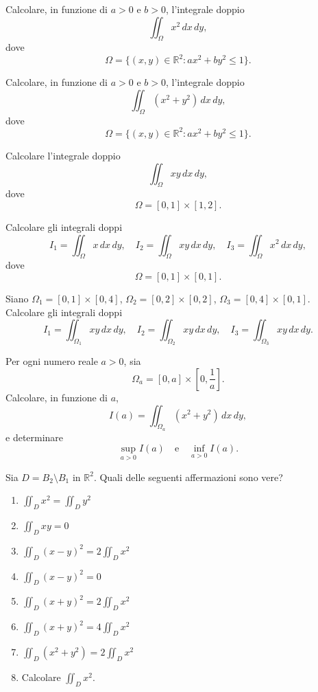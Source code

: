 \begin{exercise}
	Calcolare, in funzione di \( a > 0 \) e \( b > 0 \), l'integrale doppio
	\[
	\iint_\Omega x^2 \, dx \, dy,
	\]
	dove
	\[
	\Omega = \{(x, y) \in \mathbb{R}^2 : ax^2 + by^2 \leq 1\}.
	\]
\end{exercise}
\begin{exercise}
	Calcolare, in funzione di \( a > 0 \) e \( b > 0 \), l'integrale doppio
	\[
	\iint_\Omega (x^2 + y^2) \, dx \, dy,
	\]
	dove
	\[
	\Omega = \{(x, y) \in \mathbb{R}^2 : ax^2 + by^2 \leq 1\}.
	\]
\end{exercise}
\begin{exercise}
	Calcolare l'integrale doppio
	\[
	\iint_\Omega xy \, dx \, dy,
	\]
	dove
	\[
	\Omega = [0, 1] \times [1, 2].
	\]
\end{exercise}
\begin{exercise}
	Calcolare gli integrali doppi
	\[
	I_1 = \iint_\Omega x \, dx \, dy, \quad I_2 = \iint_\Omega xy \, dx \, dy, \quad I_3 = \iint_\Omega x^2 \, dx \, dy,
	\]
	dove
	\[
	\Omega = [0, 1] \times [0, 1].
	\]
\end{exercise}
\begin{exercise}
	Siano \( \Omega_1 = [0, 1] \times [0, 4] \), \( \Omega_2 = [0, 2] \times [0, 2] \), \( \Omega_3 = [0, 4] \times [0, 1] \). Calcolare gli integrali doppi
	\[
	I_1 = \iint_{\Omega_1} xy \, dx \, dy, \quad I_2 = \iint_{\Omega_2} xy \, dx \, dy, \quad I_3 = \iint_{\Omega_3} xy \, dx \, dy.
	\]\end{exercise}

\begin{exercise}
	Per ogni numero reale \( a > 0 \), sia
	\[
	\Omega_a = [0, a] \times \left[0, \frac{1}{a}\right].
	\]
	Calcolare, in funzione di \( a \),
	\[
	I(a) = \iint_{\Omega_a} (x^2 + y^2) \, dx \, dy,
	\]
	e determinare
	\[
	\sup_{a > 0} I(a) \quad \text{e} \quad \inf_{a > 0} I(a).
	\]
\end{exercise}
\begin{exercise}
	Sia \( D = B_2 \setminus B_1 \) in \( \mathbb{R}^2 \). Quali delle seguenti affermazioni sono vere?
	\begin{enumerate}
		\item \( \iint_D x^2 = \iint_D y^2 \)
		\item \( \iint_D xy = 0 \)
		\item \( \iint_D (x - y)^2 = 2 \iint_D x^2 \)
		\item \( \iint_D (x - y)^2 = 0 \)
		\item \( \iint_D (x + y)^2 = 2 \iint_D x^2 \)
		\item \( \iint_D (x + y)^2 = 4 \iint_D x^2 \)
		\item \( \iint_D (x^2 + y^2) = 2 \iint_D x^2 \)
		\item Calcolare \( \iint_D x^2 \).
	\end{enumerate}
\end{exercise}

